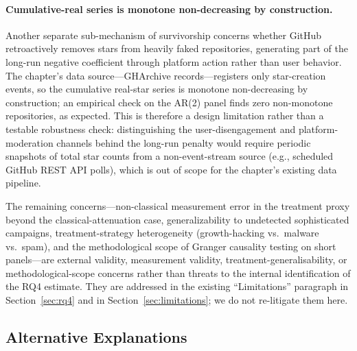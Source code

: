\paragraph{Cumulative-real series is monotone non-decreasing by construction.}
Another separate sub-mechanism of survivorship concerns whether GitHub retroactively removes stars from heavily faked repositories, generating part of the long-run negative coefficient through platform action rather than user behavior.
The chapter's data source---GHArchive  records---registers only star-creation events, so the cumulative real-star series is monotone non-decreasing by construction; an empirical check on the AR(2) panel finds zero non-monotone repositories, as expected.
This is therefore a design limitation rather than a testable robustness check: distinguishing the user-disengagement and platform-moderation channels behind the long-run penalty would require periodic snapshots of total star counts from a non-event-stream source (e.g., scheduled GitHub REST API polls), which is out of scope for the chapter's existing data pipeline.

The remaining concerns---non-classical measurement error in the treatment proxy beyond the classical-attenuation case, generalizability to undetected sophisticated campaigns, treatment-strategy heterogeneity (growth-hacking vs.\ malware vs.\ spam), and the methodological scope of Granger causality testing on short panels---are external validity, measurement validity, treatment-generalisability, or methodological-scope concerns rather than threats to the internal identification of the RQ4 estimate.
They are addressed in the existing ``Limitations'' paragraph in Section~\ref{sec:rq4} and in Section~\ref{sec:limitations}; we do not re-litigate them here.

\subsection{Alternative Explanations}
\label{sec:fake-stars-credibility-alternatives}

